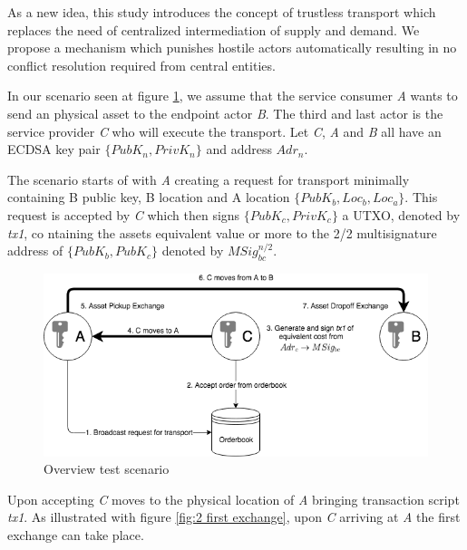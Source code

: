 As a new idea, this study introduces the concept of trustless transport which replaces the need of centralized intermediation of supply and demand. We propose a mechanism which punishes hostile actors automatically resulting in no conflict resolution required from central entities. \par
In our scenario seen at figure \ref{fig:1 main overview}, we assume that the service consumer \textit{A} wants to send an physical asset to the endpoint actor \textit{B}. The third and last actor is the service provider \textit{C} who will execute the transport. Let \textit{C}, \textit{A} and \textit{B} all have an ECDSA key pair \(\{PubK_n, PrivK_n\}\) and address \(Adr_n\). \par
The scenario starts of with \textit{A} creating a request for transport minimally containing B public key, B location and A location \(\{PubK_b, Loc_b, Loc_a\}\). This request is accepted by \textit{C} which then signs \(\{PubK_c, PrivK_c\}\) a UTXO, denoted by \textit{tx1}, co ntaining the assets equivalent value or more to the 2/2 multisignature address of \(\{PubK_b, PubK_c\}\) denoted by \(MSig_{bc}^{n/2}\). \par

\begin{figure}[h]
\centering
\includegraphics[width=1\textwidth]{images/main.png}
\caption{Overview test scenario}
\label{fig:1 main overview}
\end{figure}

Upon accepting \textit{C} moves to the physical location of \textit{A} bringing transaction script \textit{tx1}. As illustrated with figure \ref{fig:2 first exchange}, upon \textit{C} arriving at \textit{A} the first exchange can take place. \par

